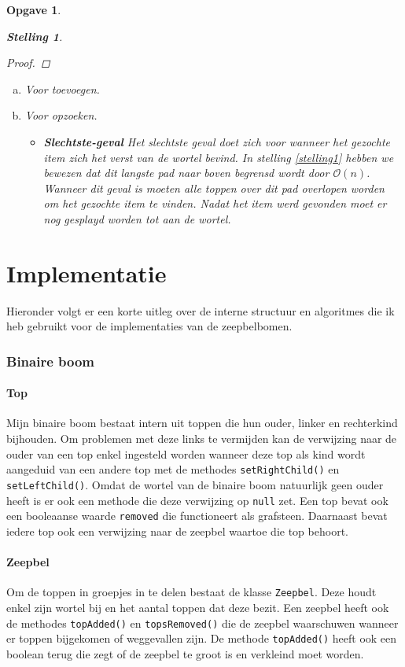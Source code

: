 \documentclass[12pt,hidelinks]{article}
\newtheorem{opgave}{Opgave}
\newtheorem{stelling}{Stelling}
\begin{document}
\begin{opgave}
\begin{stelling}
\begin{proof}
            \end{proof}
        \end{stelling}
        \begin{enumerate}[a.]
            \item Voor toevoegen.
            \item Voor opzoeken.
                \normalfont
                \begin{itemize}
                    \item \textbf{Slechtste-geval}
                        Het slechtste geval doet zich voor wanneer het gezochte item zich het verst van de wortel bevind. In stelling \ref{stelling1} hebben we bewezen dat dit langste pad
                        naar boven begrensd wordt door $\mathcal{O}(n)$. Wanneer dit geval is moeten alle toppen over dit pad overlopen worden om het gezochte item te vinden.
                        Nadat het item werd gevonden moet er nog gesplayd worden tot aan de wortel.
                \end{itemize}
        \end{enumerate}
    \end{opgave}


    \part*{Implementatie}
    Hieronder volgt er een korte uitleg over de interne structuur en algoritmes die
    ik heb gebruikt voor de implementaties van de zeepbelbomen.
    \section{Binaire boom}
    \subsection{Top}
    Mijn binaire boom bestaat intern uit toppen die hun ouder,  linker en
    rechterkind bijhouden. Om problemen met deze links te vermijden kan de verwijzing
    naar de ouder van een top enkel ingesteld worden wanneer deze top als kind wordt
    aangeduid van een andere top met de methodes {\tt setRightChild()} en {\tt setLeftChild()}. Omdat de wortel van de binaire boom natuurlijk geen
    ouder heeft is er ook een methode die deze verwijzing op {\tt null} zet.
    Een top bevat ook een booleaanse waarde {\tt removed} die functioneert als
    grafsteen. Daarnaast bevat iedere top ook een verwijzing naar de zeepbel waartoe die 
    top behoort.
    \subsection{Zeepbel}
    Om de toppen in groepjes in te delen bestaat de klasse {\tt Zeepbel}. Deze houdt
    enkel zijn wortel bij en het aantal toppen dat deze bezit. Een zeepbel heeft ook de
    methodes {\tt topAdded()} en {\tt topsRemoved()} die de zeepbel waarschuwen wanneer
    er toppen bijgekomen of weggevallen zijn. De methode {\tt topAdded()} heeft ook
    een boolean terug die zegt of de zeepbel te groot is en verkleind moet worden.
\end{document}

